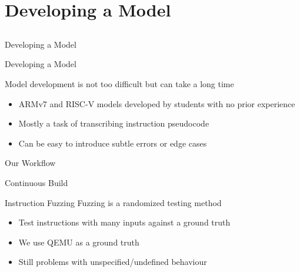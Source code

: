 \section{Developing a Model}
\subsection{}

\begin{frame}{Developing a Model}
\end{frame}

\begin{frame}{Developing a Model}

Model development is not too difficult but can take a long time

\begin{itemize}
\item ARMv7 and RISC-V models developed by students with no prior experience
\item Mostly a task of transcribing instruction pseudocode
\item Can be easy to introduce subtle errors or edge cases
\end{itemize}

\end{frame}

\begin{frame}{Our Workflow}
\end{frame}

\begin{frame}{Continuous Build}


\end{frame}

\begin{frame}{Instruction Fuzzing}
Fuzzing is a randomized testing method

\begin{itemize}
\item<2-> Test instructions with many inputs against a ground truth
\item<3-> We use QEMU as a ground truth
\item<4-> \alert{Still problems with unspecified/undefined behaviour}
\end{itemize}



\end{frame}

